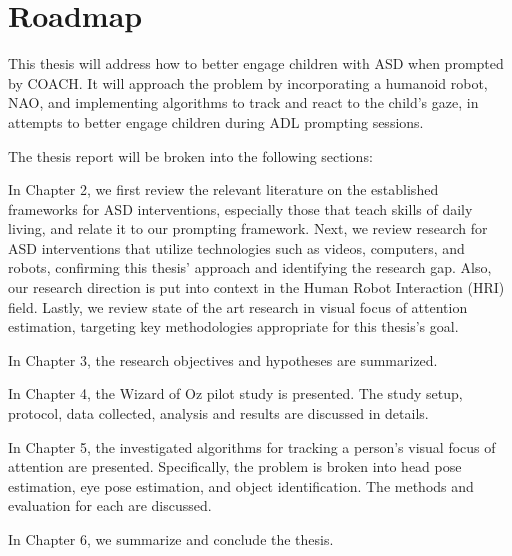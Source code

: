 \section{Roadmap}

This thesis will address how to better engage children with ASD when prompted by COACH.  It will approach the problem by incorporating a humanoid robot, NAO, and implementing algorithms to track and react to the child's gaze, in attempts to better engage children during ADL prompting sessions.


The thesis report will be broken into the following sections:


In Chapter 2, we first review the relevant literature on the established frameworks for ASD interventions, especially those that teach skills of daily living, and relate it to our prompting framework.  Next, we review research for ASD interventions that utilize technologies such as videos, computers, and robots, confirming this thesis' approach and identifying the research gap.  Also, our research direction is put into context in the Human Robot Interaction (HRI) field.  Lastly, we review state of the art research in visual focus of attention estimation, targeting key methodologies appropriate for this thesis's goal.


In Chapter 3, the research objectives and hypotheses are summarized.

In Chapter 4, the Wizard of Oz pilot study is presented.  The study setup, protocol, data collected, analysis and results are discussed in details.

In Chapter 5, the investigated algorithms for tracking a person's visual focus of attention are presented.  Specifically, the problem is broken into head pose estimation, eye pose estimation, and object identification.  The methods and evaluation for each are discussed.

In Chapter 6, we summarize and conclude the thesis.


